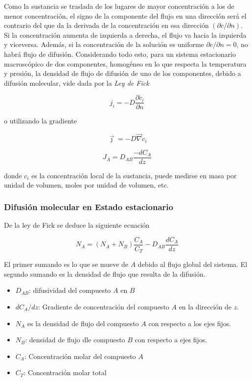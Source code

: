 Como la sustancia se traslada de los lugares de mayor concentración a los
de menor concentración, el signo de la componente del flujo en una dirección
será el contrario del que da la derivada de la concentración en esa
dirección $(\partial c/ \partial n)$. Si la concentración 
aumenta de izquierda a derecha, el flujo va hacia la izquierda y viceversa.
Además, si la concentración de la solución es uniforme $\partial c / \partial n = 0$,
no habrá flujo de difusión. Considerando todo esto, para
un sistema estacionario macroscópico de dos componentes, homogéneo en lo que
respecta la temperatura y presión, la densidad
de flujo de difusión de uno de los componentes, debido a difusión molecular, 
vide dada por la \textit{Ley de Fick}

\begin{equation}
    j_i = -D \frac{\partial c_i}{\partial n}
\end{equation}

o utilizando la gradiente

\begin{equation}
    \vec \jmath = -D \vec \nabla c_i
\end{equation}


\begin{equation}
    J_A = D_{AB} \frac{-dC_A}{dz}
\end{equation}

donde $c_i$ es la concentración local de la sustancia, puede
medirse en masa por unidad de volumen, moles por unidad de volumen, etc.

\subsubsection{Difusión molecular en Estado estacionario}

De la ley de Fick se deduce la siguiente ecuación

\begin{equation}
    N_A = (N_A + N_B) \frac{C_A}{C_T} - D_{AB} \frac{dC_A}{dz}
\end{equation}

El primer sumando es lo que se mueve de $A$ debido al flujo global
del sistema.
El segundo sumando es la densidad de flujo que resulta
de la difusión.


\begin{itemize}
    \item $D_{AB}$: difusividad del compuesto $A$ en $B$
    \item $dC_A/dz$: Gradiente de concentración del compuesto $A$ en
    la dirección de $z$.
    \item $N_A$ es la densidad de flujo del compuesto $A$ con respecto a los ejes fijos.
    \item $N_B$: densidad de flujo dle compuesto $B$ con respecto a ejes fijos.
    \item $C_A$: Concentración molar del compuesto $A$
    \item $C_T$: Concentración molar total
\end{itemize}

